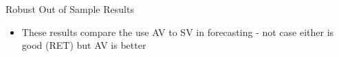 \documentclass{beamer}
\begin{document}
\begin{frame}{Robust Out of Sample Results}
\begin{table}
	\end{table}
	\begin{itemize}[<+->]
		\item These results compare the use AV to SV in forecasting - not case either is good (RET) but AV is better
	\end{itemize}
\end{frame}

%			
\end{document}
